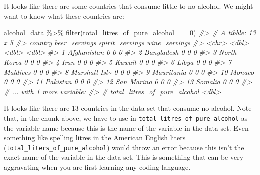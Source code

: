\documentclass[
]{book}
\newenvironment{Shaded}{\begin{snugshade}}{\end{snugshade}}
\newcommand{\CommentTok}[1]{\textcolor[rgb]{0.56,0.35,0.01}{\textit{#1}}}
\newcommand{\DecValTok}[1]{\textcolor[rgb]{0.00,0.00,0.81}{#1}}
\newcommand{\FunctionTok}[1]{\textcolor[rgb]{0.00,0.00,0.00}{#1}}
\newcommand{\NormalTok}[1]{#1}
\newcommand{\SpecialCharTok}[1]{\textcolor[rgb]{0.00,0.00,0.00}{#1}}
\begin{document}
It looks like there are some countries that consume little to no alcohol. We might want to know what these countries are:

\begin{Shaded}
\begin{Highlighting}[]
\NormalTok{alcohol\_data }\SpecialCharTok{\%\textgreater{}\%} \FunctionTok{filter}\NormalTok{(total\_litres\_of\_pure\_alcohol }\SpecialCharTok{==} \DecValTok{0}\NormalTok{)}
\CommentTok{\#\textgreater{} \# A tibble: 13 x 5}
\CommentTok{\#\textgreater{}    country       beer\_servings spirit\_servings wine\_servings}
\CommentTok{\#\textgreater{}    \textless{}chr\textgreater{}                 \textless{}dbl\textgreater{}           \textless{}dbl\textgreater{}         \textless{}dbl\textgreater{}}
\CommentTok{\#\textgreater{}  1 Afghanistan               0               0             0}
\CommentTok{\#\textgreater{}  2 Bangladesh                0               0             0}
\CommentTok{\#\textgreater{}  3 North Korea               0               0             0}
\CommentTok{\#\textgreater{}  4 Iran                      0               0             0}
\CommentTok{\#\textgreater{}  5 Kuwait                    0               0             0}
\CommentTok{\#\textgreater{}  6 Libya                     0               0             0}
\CommentTok{\#\textgreater{}  7 Maldives                  0               0             0}
\CommentTok{\#\textgreater{}  8 Marshall Isl\textasciitilde{}             0               0             0}
\CommentTok{\#\textgreater{}  9 Mauritania                0               0             0}
\CommentTok{\#\textgreater{} 10 Monaco                    0               0             0}
\CommentTok{\#\textgreater{} 11 Pakistan                  0               0             0}
\CommentTok{\#\textgreater{} 12 San Marino                0               0             0}
\CommentTok{\#\textgreater{} 13 Somalia                   0               0             0}
\CommentTok{\#\textgreater{} \# ... with 1 more variable:}
\CommentTok{\#\textgreater{} \#   total\_litres\_of\_pure\_alcohol \textless{}dbl\textgreater{}}
\end{Highlighting}
\end{Shaded}

It looks like there are 13 countries in the data set that consume no alcohol. Note that, in the chunk above, we have to use in \texttt{total\_litres\_of\_pure\_alcohol} as the variable name because this is the name of the variable in the data set. Even something like spelling litres in the American English liters (\texttt{total\_liters\_of\_pure\_alcohol}) would throw an error because this isn't the exact name of the variable in the data set. This is something that can be very aggravating when you are first learning any coding language.
\end{document}
